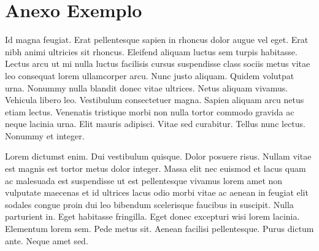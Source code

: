 %
%
% 
%
\chapter{Anexo Exemplo}
\noindent
Id magna feugiat. Erat pellentesque sapien in rhoncus dolor augue vel eget. Erat nibh animi ultricies sit rhoncus. Eleifend aliquam luctus sem turpis habitasse. Lectus arcu ut mi nulla luctus facilisis cursus suspendisse class sociis metus vitae leo consequat lorem ullamcorper arcu. Nunc justo aliquam. Quidem volutpat urna. Nonummy nulla blandit donec vitae ultrices. Netus aliquam vivamus. Vehicula libero leo. Vestibulum consectetuer magna. Sapien aliquam arcu netus etiam lectus. Venenatis tristique morbi non nulla tortor commodo gravida ac neque lacinia urna. Elit mauris adipisci. Vitae sed curabitur. Tellus nunc lectus. Nonummy et integer.

Lorem dictumst enim. Dui vestibulum quisque. Dolor posuere risus. Nullam vitae est magnis est tortor metus dolor integer. Massa elit nec euismod et lacus quam ac malesuada est suspendisse ut est pellentesque vivamus lorem amet non vulputate maecenas et id ultrices lacus odio morbi vitae ac aenean in feugiat elit sodales congue proin dui leo bibendum scelerisque faucibus in suscipit. Nulla parturient in. Eget habitasse fringilla. Eget donec excepturi wisi lorem lacinia. Elementum lorem sem. Pede metus sit. Aenean facilisi pellentesque. Purus dictum ante. Neque amet sed.


